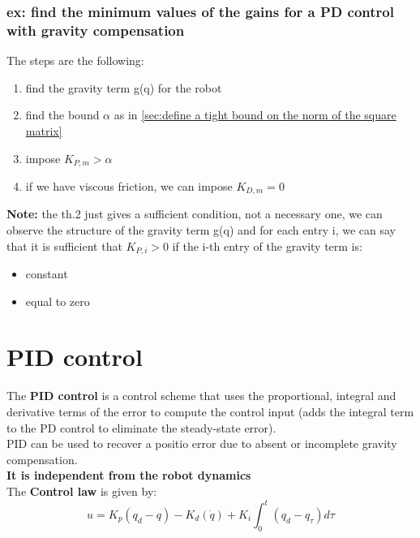 \documentclass[a4paper,12pt]{article}
\begin{document}
\subsubsection{ex: find the minimum values of the gains for
 a PD control with gravity compensation}
The steps are the following:
\begin{enumerate}
    \item find the gravity term g(q) for the robot 
    \item find  the bound $\alpha$ as in \ref{sec:define a tight bound on the norm of the square matrix}
    \item impose $K_{P,m} > \alpha$
    \item if we have viscous friction, we can impose $K_{D,m} = 0$
\end{enumerate}
\textbf{Note:} the th.2 just gives a sufficient condition, not a
     necessary one, we can observe the structure of the gravity term 
     g(q) and for each entry i, we can say that it is sufficient that 
        $K_{P,i} > 0$ if the i-th entry of the gravity term is: 
        \begin{itemize}
        \item constant 
        \item equal to zero
        \end{itemize}


\section{PID control}
The \textbf{PID control} is a control scheme that uses the
proportional, integral and derivative terms of the error to compute the
control input (adds the integral term to the PD control to eliminate
the steady-state error).\\
PID can be used to recover a positio error due to absent or incomplete 
gravity compensation.\\
\textbf{It is independent from the robot dynamics}\\
The \textbf{Control law} is given by:
\begin{equation}
    u = K_p(q_d-q) - K_d(\dot{q}) + K_i \int_0^t (q_d-q_\tau)d\tau 
\end{equation}
\end{document}
